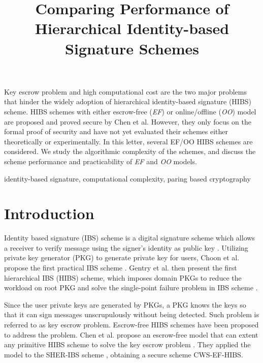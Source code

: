\documentclass[letter]{ieice}
\title{Comparing Performance of Hierarchical Identity-based Signature Schemes}
\begin{document}
\maketitle
\begin{summary}
Key escrow problem and high computational cost are the two major problems that hinder the widely adoption of hierarchical identity-based signature (HIBS) scheme.
HIBS schemes with either escrow-free (\emph{EF}) or online/offline (\emph{OO}) model are proposed and proved secure by Chen et al.
However, they only focus on  the formal proof of security and have not yet evaluated their schemes either theoretically or experimentally.
In this letter, several EF/OO HIBS schemes are considered. 
We study the algorithmic complexity of the schemes, and discuss the scheme performance and practicability of \emph{EF} and \emph{OO} models.
\end{summary}
\begin{keywords}
identity-based signature, computational complexity, paring based cryptography
\end{keywords}

\section{Introduction}
Identity based signature (IBS) scheme is a digital signature scheme which allows a receiver to verify message using the signer's identity as public key \cite{shamir1985identity}. 
Utilizing private key generator (PKG) to generate private key for users, Choon et al. propose the first practical IBS scheme \cite{choon2002identity}. 
Gentry et al. then present the first hierarchical IBS (HIBS) scheme, which imposes domain PKGs to reduce the workload on root PKG and solve the single-point failure problem in IBS scheme \cite{gentry2002hierarchical}. 
\par

Since the user private keys are generated by PKGs, a PKG knows the keys so that it can sign messages unscrupulously without being detected.
Such problem is referred to as key escrow problem.
Escrow-free HIBS schemes have been proposed to address the problem. 
Chen et al. propose an escrow-free model that can extent any primitive HIBS scheme to solve the key escrow problem \cite{anescrowfree2015chen}. 
They applied the model to the SHER-IBS scheme \cite{chow2004secure}, obtaining a secure scheme CWS-EF-HIBS.
\par
\end{document}
